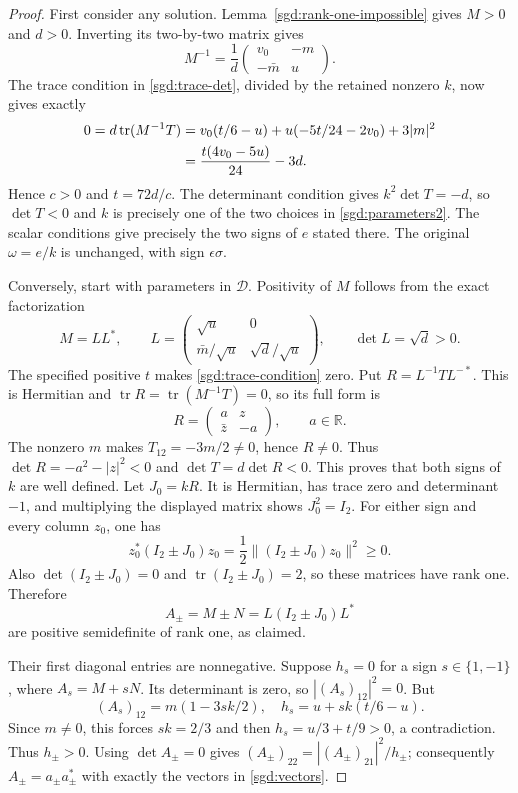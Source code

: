 \begin{proof}
First consider any solution. Lemma~\ref{sgd:rank-one-impossible}
gives $M>0$ and $d>0$. Inverting its two-by-two matrix gives
\[
 M^{-1}=\frac1d\begin{pmatrix}v_0&-m\\-\bar m&u\end{pmatrix}.
\]
The trace condition in \eqref{sgd:trace-det}, divided by the retained
nonzero $k$, now gives exactly
\begin{align}
 0=d\operatorname{tr}(M^{-1}T)
 &=v_0(t/6-u)+u(-5t/24-2v_0)+3|m|^2\notag\\
 &=\frac{t(4v_0-5u)}{24}-3d.\label{sgd:trace-condition}
\end{align}
Hence $c>0$ and $t=72d/c$. The determinant condition gives
$k^2\det T=-d$, so $\det T<0$ and $k$ is precisely one of
the two choices in \eqref{sgd:parameters2}. The scalar conditions
give precisely the two signs of $e$ stated there. The original
$\omega=e/k$ is unchanged, with sign $\epsilon\sigma$.

Conversely, start with parameters in $\mathcal D$. Positivity of $M$
follows from the exact factorization
\[
 M=LL^*,\qquad
 L=\begin{pmatrix}\sqrt u&0\\\bar m/\sqrt u&\sqrt d/\sqrt u\end{pmatrix},
 \qquad \det L=\sqrt d>0.
\]
The specified positive $t$ makes \eqref{sgd:trace-condition} zero.
Put $R=L^{-1}TL^{-*}$. This is Hermitian and
$\operatorname{tr} R=\operatorname{tr}(M^{-1}T)=0$, so its full form is
\[
 R=\begin{pmatrix}a&z\\\bar z&-a\end{pmatrix},\qquad a\in\mathbb R.
\]
The nonzero $m$ makes $T_{12}=-3m/2\ne0$, hence $R\ne0$.
Thus $\det R=-a^2-|z|^2<0$ and $\det T=d\det R<0$.
This proves that both signs of $k$ are well defined. Let $J_0=kR$.
It is Hermitian, has trace zero and determinant $-1$, and multiplying
the displayed matrix shows $J_0^2=I_2$.
For either sign and every column $z_0$, one has
\[
 z_0^*(I_2\pm J_0)z_0=\frac12\|(I_2\pm J_0)z_0\|^2\ge0.
\]
Also $\det(I_2\pm J_0)=0$ and $\operatorname{tr}(I_2\pm J_0)=2$,
so these matrices have rank one. Therefore
\[
 A_\pm=M\pm N=L(I_2\pm J_0)L^*
\]
are positive semidefinite of rank one, as claimed.

Their first diagonal entries are nonnegative. Suppose $h_s=0$ for
a sign $s\in\{1,-1\}$, where $A_s=M+sN$. Its determinant is
zero, so $|(A_s)_{12}|^2=0$. But
\[
 (A_s)_{12}=m(1-3sk/2),\quad
 h_s=u+sk(t/6-u).
\]
Since $m\ne0$, this forces $sk=2/3$ and then
$h_s=u/3+t/9>0$, a contradiction. Thus $h_\pm>0$.
Using $\det A_\pm=0$ gives
$(A_\pm)_{22}=|(A_\pm)_{21}|^2/h_\pm$; consequently
$A_\pm=a_\pm a_\pm^*$ with exactly the vectors in
\eqref{sgd:vectors}.


\end{proof}
